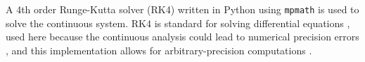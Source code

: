 A 4th order Runge-Kutta solver (RK4) written in Python using {\tt mpmath} is
used to solve the continuous system. RK4 is standard for solving
differential equations \cite{Gonsalves2009}, used here because the
continuous analysis could lead to numerical precision errors
\cite{Baer1989}, and this implementation allows for arbitrary-precision
computations \cite{Mpmath2013}.
  \stopsimplecolumns